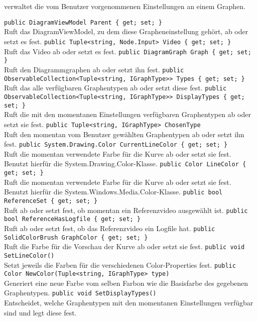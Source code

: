 \paragraph{}~\\
 verwaltet die vom Benutzer vorgenommenen Einstellungen an einem Graphen.
\begin{itemize}
	\add \verb!public DiagramViewModel Parent { get; set; }! \\
	Ruft das DiagramViewModel, zu dem diese Grapheneinstellung gehört, ab oder setzt es fest.
	\add \verb!public Tuple<string, Node.Input> Video { get; set; }! \\
	Ruft das Video ab oder setzt es fest.
	\add \verb!public DiagramGraph Graph { get; set; }! \\
	Ruft den Diagrammgraphen ab oder setzt ihn fest.
	\add \verb!public ObservableCollection<Tuple<string, IGraphType>> Types { get; set; }! \\
	Ruft das alle verfügbaren Graphentypen ab oder setzt diese fest.
	\add \verb!public ObservableCollection<Tuple<string, IGraphType>> DisplayTypes { get; set; }! \\
	Ruft die mit den momentanen Einstellungen verfügbaren Graphentypen ab oder setzt sie fest.
	\add \verb!public Tuple<string, IGraphType> ChosenType! \\
	Ruft den momentan vom Benutzer gewählten Graphentypen ab oder setzt ihn fest.
	\add \verb!public System.Drawing.Color CurrentLineColor { get; set; }! \\
	Ruft die momentan verwendete Farbe für die Kurve ab oder setzt sie fest. Benutzt hierfür die System.Drawing.Color-Klasse.
	\add \verb!public Color LineColor { get; set; }! \\
	Ruft die momentan verwendete Farbe für die Kurve ab oder setzt sie fest. Benutzt hierfür die System.Windows.Media.Color-Klasse.
	\add \verb!public bool ReferenceSet { get; set; }! \\
	Ruft ab oder setzt fest, ob momentan ein Referenzvideo ausgewählt ist.
	\add \verb!public bool ReferenceHasLogfile { get; set; }! \\
	Ruft ab oder setzt fest, ob das Referenzvideo ein Logfile hat.
	\add \verb!public SolidColorBrush GraphColor { get; set; }! \\
	Ruft die Farbe für die Vorschau der Kurve ab oder setzt sie fest.
	\add \verb!public void SetLineColor()! \\
	Setzt jeweils die Farben für die verschiedenen Color-Properties fest.
	\add \verb!public Color NewColor(Tuple<string, IGraphType> type)! \\
	Generiert eine neue Farbe vom selben Farbon wie die Basisfarbe des gegebenen Graphentypen.
	\add \verb!public void SetDisplayTypes()! \\
	Entscheidet, welche Graphentypen mit den momentanen Einstellungen verfügbar sind und legt diese fest.
\end{itemize}

